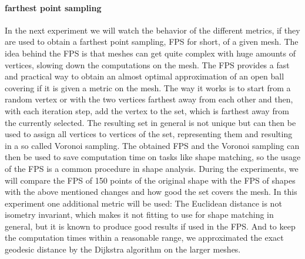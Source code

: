 \paragraph{farthest point sampling}
In the next experiment we will watch the behavior of the different metrics, if they are used to obtain a farthest point sampling, FPS for short, of a given mesh.
The idea behind the FPS is that meshes can get quite complex with huge amounts of vertices, slowing down the computations on the mesh.
The FPS provides a fast and practical way to obtain an almost optimal approximation of an open ball covering if it is given a metric on the mesh.
The way it works is to start from a random vertex or with the two vertices farthest away from each other and then, with each iteration step, add the vertex to the set, which is farthest away from the currently selected.
The resulting set in general is not unique but can then be used to assign all vertices to vertices of the set, representing them and resulting in a so called Voronoi sampling.
The obtained FPS and the Voronoi sampling can then be used to save computation time on tasks like shape matching, so the usage of the FPS is a common procedure in shape analysis.
During the experiments, we will compare the FPS of 150 points  of the original shape with the FPS of shapes with the above mentioned changes and how good the set covers the mesh.
In this experiment one additional metric will be used:
The Euclidean distance is not isometry invariant, which makes it not fitting to use for shape matching in general, but it is known to produce good results if used in the FPS.
And to keep the computation times within a reasonable range, we approximated the exact geodesic distance by the Dijkstra algorithm on the larger meshes.

